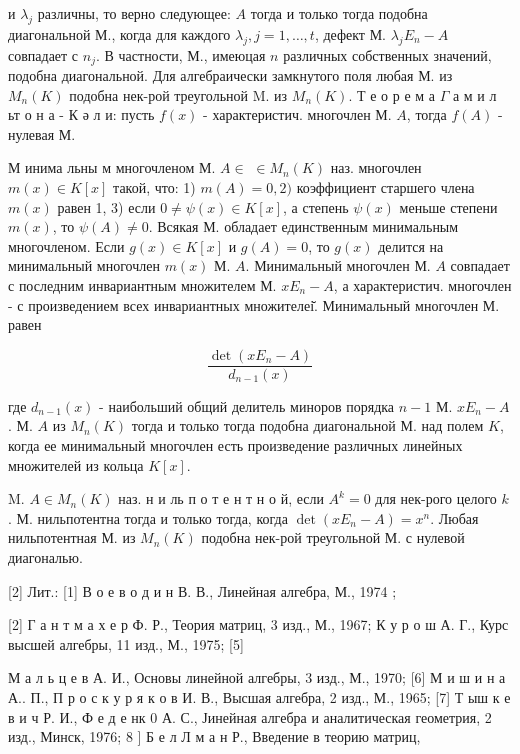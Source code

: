 \documentclass[10pt]{article}
\begin{document}
и $\lambda_{j}$ различны, то верно следующее: $A$ тогда и только тогда подобна диагональной М., когда для каждого $\lambda_{j}, j=1, \ldots, t$, дефект М. $\lambda_{j} E_{n}-A$ совпадает с $n_{j}$. В частности, М., имеюцая $n$ различных собственных значений, подобна диагональной. Для алгебраически замкнутого поля любая М. из $M_{n}(K)$ подобна нек-рой треугольной $\mathrm{M}$. из $M_{n}(K)$. Т е о р е м а $\Gamma$ а м и л ьт о н а - К ә л и: пусть $f(x)$ - характеристич. многочлен М. $A$, тогда $f(A)$ - нулевая М.



М инима льны м многочленом М. $A \in$ $\in M_{n}(K)$ наз. многочлен $m(x) \in K[x]$ такой, что: 1) $m(A)=0,2)$ коэффициент старшего члена $m(x)$ равен 1, 3) если $0 \neq \psi(x) \in K[x]$, а степень $\psi(x)$ меньше степени $m(x)$, то $\psi(A) \neq 0$. Всякая М. обладает единственным минимальным многочленом. Если $g(x) \in K[x]$ и $g(A)=0$, то $g(x)$ делится на минимальный многочлен $m(x)$ М. $A$. Минимальный многочлен М. $A$ совпадает с последним инвариантным множителем М. $x E_{n}-A$, а характеристич. многочлен - с произведением всех инвариантных множителеі̆. Минимальный многочлен М. равен



\[

\frac{\operatorname{det}\left(x E_{n}-A\right)}{d_{n-1}(x)}

\]



где $d_{n-1}(x)$ - наибольший общий делитель миноров порядка $n-1$ М. $x E_{n}-A$. М. $A$ из $M_{n}(K)$ тогда и только тогда подобна диагональной М. над полем $K$, когда ее минимальный многочлен есть произведение различных линейных множителей из кольца $K[x]$.



M. $A \in M_{n}(K)$ наз. н и ль п о т е н т н о й, если $A^{k}=0$ для нек-рого целого $k$. М. нильпотентна тогда и только тогда, когда $\operatorname{det}\left(x E_{n}-A\right)=x^{n}$. Любая нильпотентная М. из $M_{n}(K)$ подобна нек-рой треугольной М. с нулевой диагональю.



[2] Лит.: [1] В о е в о д и н В. В., Линейная алгебра, М., 1974 ;



[2] Г а н т м а х е р Ф. Р., Теория матриц, 3 изд., М., 1967; К у р о ш А. Г., Курс высшей алгебры, 11 изд., М., 1975; [5]

М а л ь ц е в А. И., Основы линейной алгебры, 3 изд., М., 1970; [6] М и ш и н а А.. П., П р о с к у р я к о в И. В., Высшая алгебра, 2 изд., М., 1965; [7] Т ыш к е в и ч Р. И., Ф е д е нк 0 А. С., Јинейная алгебра и аналитическая геометрия, 2 изд., Минск, 1976; 8 ] Б е л Л м а н Р., Введение в теорию матриц,
\end{document}
